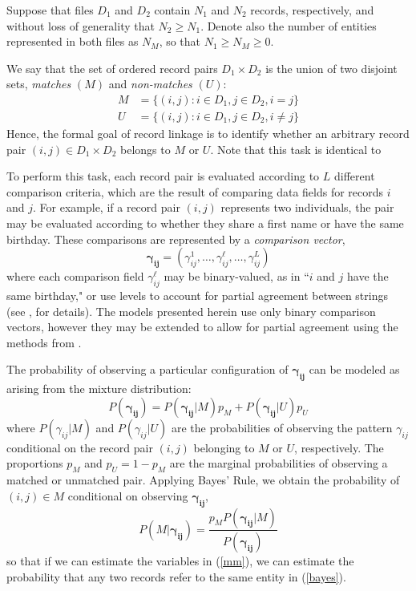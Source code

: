 \documentclass[12pt]{article}
\newcommand\gamij{\mathbf{\gamma_{ij}}}
\begin{document}
Suppose that files $D_1$ and $D_2$ contain $N_1$ and $N_2$ records, respectively, and without loss of generality that $N_2 \geq N_1$.  Denote also the number of entities represented in both files as $N_{M}$, so that $N_1 \geq N_M \geq 0$. 

We say that the set of ordered record pairs $D_1 \times D_2$ is the union of two disjoint sets, \textit{matches} $(M)$ and \textit{non-matches} $(U)$:
\begin{align*} M &= \{(i,j): i\in D_1, j\in D_2, i=j\} \\ U &= \{(i,j): i\in D_1, j\in D_2, i\neq j\}\end{align*} 
Hence, the formal goal of record linkage is to identify whether an arbitrary record pair $(i,j)\in D_1\times D_2$ belongs to $M$ or $U$.   Note that this task is identical to 

To perform this task, each record pair is evaluated according to $L$ different comparison criteria, which are the result of comparing data fields for records $i$ and $j$.  For example, if a record pair $(i,j)$ represents two individuals, the pair may be evaluated according to whether they share a first name or have the same birthday.  These comparisons are represented by a \textit{comparison vector}, $$\mathbf{\gamma_{ij}}= (\gamma_{ij}^1, \dots, \gamma_{ij}^{\ell}, \dots, \gamma_{ij}^L)$$  where each comparison field $\gamma_{ij}^{\ell}$ may be binary-valued, as in ``$i$ and $j$ have the same birthday," or use levels to account for partial agreement between strings (see \citealp{winkler90}, for details).  The models presented herein use only binary comparison vectors, however they may be extended to allow for partial agreement using the methods from \cite{sadinle_2017}.

The probability of observing a particular configuration of $\gamij$ can be modeled as arising from the mixture distribution:
\begin{equation}
P(\gamij) = P(\gamij | M) p_M + P(\gamij | U) p_U 
\label{mm}
\end{equation}
where $P(\gamma_{ij} | M)$ and $P(\gamma_{ij} | U)$ are the probabilities of observing the pattern $\gamma_{ij}$ conditional on the record pair $(i,j)$ belonging to $M$ or $U$, respectively.  The proportions $p_M$ and $p_U = 1-p_M$ are the marginal probabilities of observing a matched or unmatched pair.  Applying Bayes' Rule, we obtain the probability of $(i,j) \in M$ conditional on observing $\gamij$,
\begin{equation} P(M | \gamij) = \frac{p_M P(\gamij | M)}{P(\gamij)} \label{bayes} \end{equation}
so that if we can estimate the variables in (\ref{mm}), we can estimate the probability that any two records refer to the same entity in (\ref{bayes}).  
\end{document}
